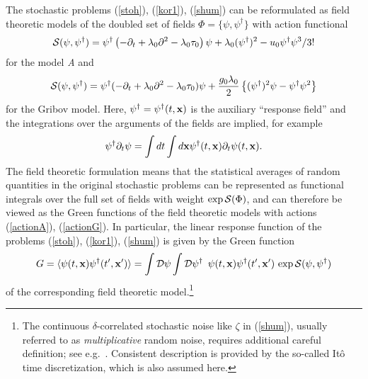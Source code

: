\documentclass[12pt]{iopart}
\def\S{{\cal S}}
\begin{document}
The stochastic problems (\ref{stoh}), (\ref{kor1}), (\ref{shum}) can be
reformulated as field theoretic models of the
doubled set of fields $\Phi = \{\psi,\psi^{\dag}\}$ with action functional
\begin{eqnarray}
\S(\psi,\psi^{\dag}) =  \psi^{\dag}
\left(-\partial_{t}+\lambda_{0} \partial^{2}- \lambda_{0}\tau_{0}\right)
\psi + \lambda_{0} (\psi^{\dagger})^2 - u_{0} \psi^{\dag}\psi^3/3!
\label{actionA}
\end{eqnarray}
for the model {\it A} and
\begin{eqnarray}
\S(\psi,\psi^{\dag}) =  \psi^{\dag}
(-\partial_{t}+\lambda_{0} \partial^{2}- \lambda_{0}\tau_{0}) \psi
+ \frac{g_{0}\lambda_{0}}{2} \left\{ (\psi^{\dagger})^2\psi -
\psi^{\dagger}\psi^2  \right\}
\label{actionG}
\end{eqnarray}
for the Gribov model.
Here, $\psi^{\dag}=\psi^{\dag}(t,{\bf x})$ is the auxiliary ``response
field'' and the integrations over the arguments of the fields are implied,
for example
\[  \psi^{\dag}\partial_{t}\psi = \int dt \int d{\bf x}
\psi^{\dag}(t,{\bf x})\partial_{t}\psi(t,{\bf x}). \]
The field theoretic formulation means that the statistical averages
of random quantities in the original stochastic problems can be represented
as functional integrals over the full set of fields with weight
$\exp {\cal S}(\Phi)$, and can therefore be viewed as the Green functions
of the field theoretic models with actions (\ref{actionA}), (\ref{actionG}).
In particular, the linear response function of the problems
(\ref{stoh}), (\ref{kor1}), (\ref{shum}) is given by the Green function
\begin{eqnarray}
G=\langle \psi(t, {\bf x}) \psi^{\dag}(t', {\bf x'} ) \rangle =
\int {\cal D}\psi \int {\cal D} \psi^{\dag}\ \,
\psi(t, {\bf x}) \psi^{\dag}(t', {\bf x'})\, \exp {\cal S}(\psi,\psi^{\dag})
\label{respd}
\end{eqnarray}
of the corresponding field theoretic model.\footnote{The continuous
$\delta$-correlated stochastic noise like $\zeta$ in (\ref{shum}), usually
referred to as {\it multiplicative} random noise, requires additional
careful definition; see e.g.~\cite{vanK}. Consistent description is provided
by the so-called It\^{o} time discretization, which is also assumed here.}
\end{document}

